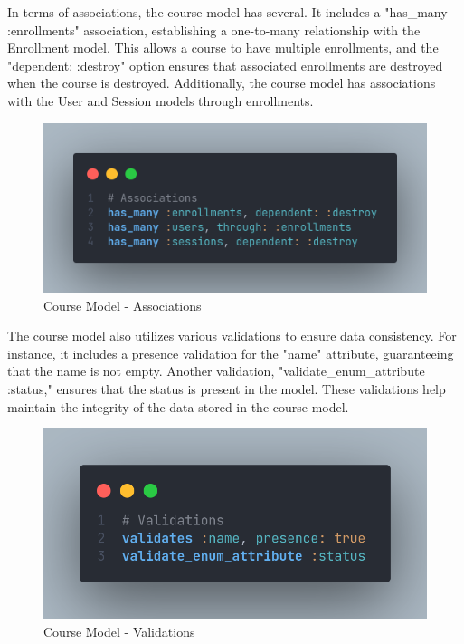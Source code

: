\begin{justify}
        \vspace{0.25cm}
        \newendline In terms of associations, the course model has several. It includes a "has\_many :enrollments" association, establishing a one-to-many relationship with the Enrollment model. This allows a course to have multiple enrollments, and the "dependent: :destroy" option ensures that associated enrollments are destroyed when the course is destroyed. Additionally, the course model has associations with the User and Session models through enrollments.
        
        \begin{figure}[H]
            \centerline{\includegraphics[width=150mm,scale=1]{figures/implementation_and_testing/implementation/backend/course_associations.png}}
            \caption{Course Model - Associations}
        \end{figure}

        \vspace{0.25cm}
        \newendline The course model also utilizes various validations to ensure data consistency. For instance, it includes a presence validation for the "name" attribute, guaranteeing that the name is not empty. Another validation, "validate\_enum\_attribute :status," ensures that the status is present in the model. These validations help maintain the integrity of the data stored in the course model.
        
        \begin{figure}[H]
            \centerline{\includegraphics[width=150mm,scale=1]{figures/implementation_and_testing/implementation/backend/course_validations.png}}
            \caption{Course Model - Validations}
        \end{figure}


\end{justify}
